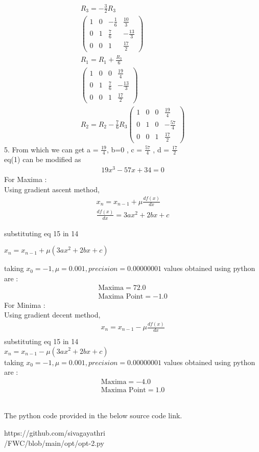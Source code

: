 \documentclass[a4paper,10pt]{report}
\newcommand{\myvec}[1]{\ensuremath{\begin{pmatrix}#1\end{pmatrix}}}
\begin{document}
\begin{multicols}{2}
\begin{align*}
R_3 = -\frac{3}{2}R_3\\
 \myvec {1&0&-\frac{1}{6}&\frac{10}{3} \\ 0&1&\frac{7}{6}&-\frac{13}{3} \\ 0&0&1&\frac{17}{2}} \\
 R_1 = R_1 + \frac{R_3}{6}\\
\myvec {1&0&0&\frac{19}{4} \\ 0&1&\frac{7}{6}&-\frac{13}{3} \\ 0&0&1&\frac{17}{2}} \\
R_2 = R_2 - \frac{7}{6}R_3
\myvec {1&0&0&\frac{19}{4} \\ 0&1&0&-\frac{57}{4} \\ 0&0&1&\frac{17}{2}}
\end{align*}
5. From which we can get a = $\frac{19}{4}$, b=0 , c = $\frac{57}{4}$ , d = $\frac{17}{2}$ \\
eq(1) can be modified as \begin{align} 19x^3 -57x+34=0 
\end{align}
For Maxima : \\
    Using gradient ascent method,
    \begin{align}
    x_n=x_{n-1}+\mu\frac{df(x)}{dx}\\
    \frac{df(x)}{dx} = 3ax^2+2bx+c 
    \end{align}
    \raggedright substituting eq 15 in 14 \\
    \raggedright $x_n =x_{n-1}+\mu(3ax^2+2bx+c)$ \\
    \raggedright taking $x_0 = -1, \mu = 0.001 ,precision = 0.00000001$ values obtained using python are :
    \begin{align}
\boxed{\text{Maxima} = 72.0} \\
\boxed{\text{Maxima Point} = -1.0}
\end{align}
For Minima : \\
    Using gradient decent method,
    \begin{align}
    x_n=x_{n-1}-\mu\frac{df(x)}{dx}\\
    \end{align}
    substituting eq 15 in 14 \\
    $x_n=x_{n-1}-\mu(3ax^2+2bx+c)$ \\
    taking $x_0 = -1, \mu = 0.001 ,precision = 0.00000001$ values obtained using python are :
    \begin{align}
\boxed{\text{Maxima} = -4.0} \\
\boxed{\text{Maxima Point} = 1.0}
\end{align}
\vspace{2mm}\\
\raggedright\large{The python code provided in the below source code link.} \\
\begin{mdframed}
\raggedright\large{https://github.com/sivagayathri \\ /FWC/blob/main/opt/opt-2.py}
\end{mdframed}
\end{multicols}
\end{document}

